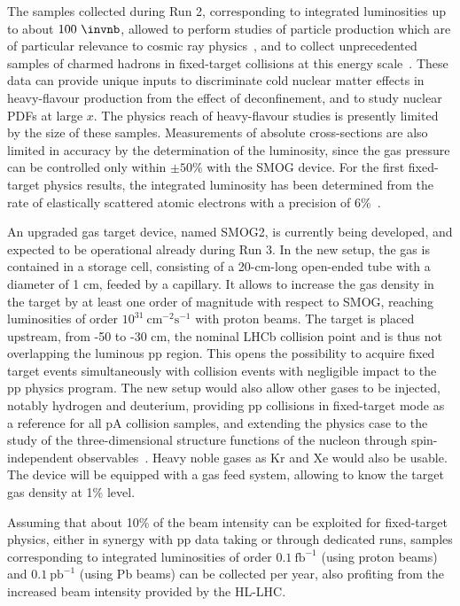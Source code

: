 \documentclass[../report.tex]{subfiles}
\begin{document}
The samples collected during Run 2, corresponding
to integrated luminosities up to about $100~\invnb$, 
allowed to perform 
studies of particle production which are of particular relevance
to cosmic ray physics~\cite{Aaij:2018svt}, and to
collect unprecedented samples of charmed hadrons in
fixed-target collisions at this energy
scale~\cite{Aaij:2018ogq}. 
These data can provide unique inputs to
discriminate cold nuclear matter effects in heavy-flavour production
from the effect of deconfinement, and to study nuclear PDFs 
at large $x$. The physics reach of heavy-flavour studies is presently
limited by the size of these samples. Measurements of absolute
cross-sections are also limited in accuracy by the determination of the
luminosity, since the gas pressure can be controlled only
within $\pm 50\%$ with the SMOG device. For the first fixed-target physics
results, the integrated luminosity has been determined from the rate of
elastically scattered atomic electrons with a precision of
6\%~\cite{Aaij:2018svt}. 

An upgraded gas target device, named SMOG2, is currently being developed, and expected
to be operational already during Run 3. 
In the new setup, the gas is contained in a storage cell, consisting
of a 20-cm-long open-ended tube with a diameter of 1 cm, feeded by a capillary.
It allows to increase the gas density in the target
by at least one order of magnitude with respect to SMOG, reaching
luminosities of order $10^{31}~\text{cm}^{-2}\text{s}^{-1}$ with
proton beams.
The target is placed upstream, from -50 to -30 cm, the nominal  LHCb
collision point and is thus not overlapping the luminous pp region.
This opens the possibility to acquire fixed target events
simultaneously with collision events with negligible impact to the
pp physics program.
The new setup would also allow other gases to be injected, notably hydrogen and deuterium, providing
pp collisions in fixed-target mode as a reference for all pA
collision samples, and extending the physics case to the study
of the three-dimensional structure functions of the nucleon through
spin-independent observables~\cite{3dpdf}. Heavy noble gases as Kr
and Xe would also be usable.
The device will be equipped with a gas feed system, allowing
to know the target gas density at 1\% level.

Assuming that about 10\% of the beam intensity can be exploited for
fixed-target physics, either in synergy with pp data taking or through dedicated runs,
samples corresponding to integrated luminosities of order $0.1~\textrm{fb}^{-1}$
(using proton beams) and $0.1~\textrm{pb}^{-1}$ (using Pb beams) 
can be collected per year, also profiting from the increased beam
intensity provided by the HL-LHC.
\end{document}
